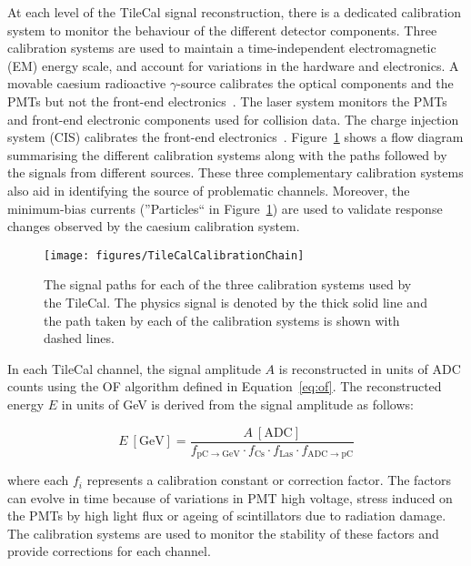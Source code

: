 At each level of the TileCal signal reconstruction, there is a dedicated calibration system to monitor the behaviour of the different detector components. 
Three calibration systems are used to maintain a time-independent electromagnetic (EM) energy scale, and account for variations in the hardware and electronics. A movable caesium radioactive $\gamma$-source calibrates the optical components and the PMTs but not the front-end electronics~\cite{Blanchot:2020lyh}. The laser system monitors the PMTs and front-end electronic components used for collision data. The charge injection system (CIS) calibrates the front-end electronics~\cite{TCAL-2010-01}. Figure~\ref{fig:TileCalCalibrationChain} shows a flow diagram summarising the different calibration systems along with the paths followed by the signals from different sources. These three complementary calibration systems also aid in identifying the source of problematic channels. Moreover, the minimum-bias currents (''Particles`` in Figure~\ref{fig:TileCalCalibrationChain}) are used to validate response changes observed by the caesium calibration system. 

\begin{figure}[htbp]
\centering
\texttt{[image: figures/TileCalCalibrationChain]}
\caption{The signal paths for each of the three calibration systems used by the TileCal. The physics signal is denoted by the thick solid line and the path taken by each of the calibration systems is shown with dashed lines.}
\label{fig:TileCalCalibrationChain}
\end{figure}

In each TileCal channel, the signal amplitude $A$ is reconstructed in units of ADC counts using the OF algorithm defined in Equation~\eqref{eq:of}. The reconstructed energy $E$ in units of GeV is derived from the signal amplitude as follows: 

\begin{equation}
E\ [\mathrm{GeV}]=\frac{A\ [\mathrm{ADC}]}{f_{\mathrm{pC}\to \mathrm{GeV}}\cdot f_{\mathrm{Cs}}\cdot f_{\mathrm{Las}} \cdot f_{\mathrm{ADC}\to \mathrm{pC}}}
\label{eq:channelEnergy}
\end{equation}

where each $f_i$ represents a calibration constant or correction factor. 
The factors can evolve in time because of variations in PMT high voltage, stress induced on the PMTs by high light flux or ageing of scintillators due to radiation damage. The calibration systems are used to monitor the stability of these factors and provide corrections for each channel.

